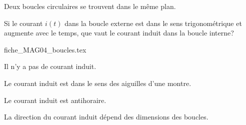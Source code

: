 \begin{enonce}
Deux boucles circulaires  se trouvent dans le même plan. 

Si
le courant $i(t)$ dans la boucle externe est dans le sens trigonométrique
et augmente avec le temps, que vaut le courant induit dans la boucle
interne? 

                                \initialisationPartieGauche %
%            
\vspace{0.25 cm}                                               %
\begin{center}
{fiche_MAG04_boucles.tex}
\end{center}

\smallskip

                                \initialisationPartieDroite %
	\vspace{-0.25 cm} 
	
	\begin{listeQCM1Colonne}
	\item Il n'y a pas de courant induit.
	\item Le courant induit est dans le sens des aiguilles d'une montre. 
	\item Le courant induit est antihoraire. 
	\item La direction du courant induit dépend des dimensions des boucles.
	\end{listeQCM1Colonne}



                               \finalisationDuPartageDePage %


\end{enonce}

